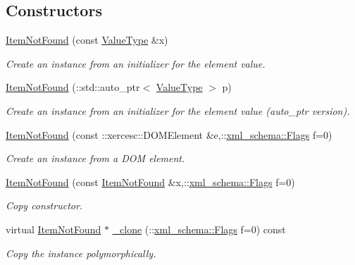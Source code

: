 \subsection*{Constructors}
\begin{DoxyCompactItemize}
\item 
\hyperlink{classopenstack_1_1xml_1_1ItemNotFound_afa9bbcd2a5009db4685d81b288ef5a4e}{ItemNotFound} (const \hyperlink{classopenstack_1_1xml_1_1ItemNotFoundAPIFault}{ValueType} \&x)
\begin{DoxyCompactList}\small\item\em Create an instance from an initializer for the element value. \item\end{DoxyCompactList}\item 
\hyperlink{classopenstack_1_1xml_1_1ItemNotFound_a8614f6e7c0800caba4c338d4fab35d4b}{ItemNotFound} (::std::auto\_\-ptr$<$ \hyperlink{classopenstack_1_1xml_1_1ItemNotFoundAPIFault}{ValueType} $>$ p)
\begin{DoxyCompactList}\small\item\em Create an instance from an initializer for the element value (auto\_\-ptr version). \item\end{DoxyCompactList}\item 
\hyperlink{classopenstack_1_1xml_1_1ItemNotFound_a276aa6dd05dbc63bc896068c376be733}{ItemNotFound} (const ::xercesc::DOMElement \&e,::\hyperlink{namespacexml__schema_affb4c227cbd9aa7453dd1dc5a1401943}{xml\_\-schema::Flags} f=0)
\begin{DoxyCompactList}\small\item\em Create an instance from a DOM element. \item\end{DoxyCompactList}\item 
\hyperlink{classopenstack_1_1xml_1_1ItemNotFound_af5c84f512ec31919fabbd343c89d4b23}{ItemNotFound} (const \hyperlink{classopenstack_1_1xml_1_1ItemNotFound}{ItemNotFound} \&x,::\hyperlink{namespacexml__schema_affb4c227cbd9aa7453dd1dc5a1401943}{xml\_\-schema::Flags} f=0)
\begin{DoxyCompactList}\small\item\em Copy constructor. \item\end{DoxyCompactList}\item 
virtual \hyperlink{classopenstack_1_1xml_1_1ItemNotFound}{ItemNotFound} $\ast$ \hyperlink{classopenstack_1_1xml_1_1ItemNotFound_ab25d20d23e0e648c827faa89c2416513}{\_\-clone} (::\hyperlink{namespacexml__schema_affb4c227cbd9aa7453dd1dc5a1401943}{xml\_\-schema::Flags} f=0) const 
\begin{DoxyCompactList}\small\item\em Copy the instance polymorphically. \item\end{DoxyCompactList}\end{DoxyCompactItemize}
